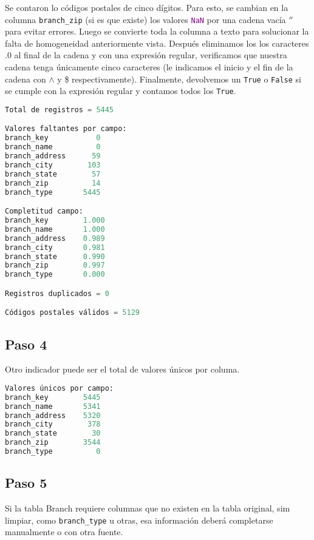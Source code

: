 Se contaron lo códigos postales de cinco dígitos. Para esto, se cambian en 
la columna \texttt{branch\_zip} (si es que existe) los valores 
\textcolor{purple}{\texttt{NaN}} por una cadena vacía $''$ para evitar errores. 
Luego se convierte toda la columna a texto para solucionar la falta de homogeneidad 
anteriormente vista. Después eliminamos los los caracteres $.0$ al final de la cadena 
y con una expresión regular, verificamos que nuestra cadena tenga únicamente cinco 
caracteres (le indicamos el inicio y el fin de la cadena con $\land$ y \$ respectivamente).
Finalmente, devolvemos un \texttt{True} o \texttt{False} si se cumple con la expresión 
regular y contamos todos los \texttt{True}. 

\vspace{0.5 cm}

\begin{lstlisting}[language = Python, caption = {Estadísticas}]
Total de registros = 5445

Valores faltantes por campo:
branch_key           0
branch_name          0
branch_address      59
branch_city        103
branch_state        57
branch_zip          14
branch_type       5445

Completitud campo:
branch_key        1.000
branch_name       1.000
branch_address    0.989
branch_city       0.981
branch_state      0.990
branch_zip        0.997
branch_type       0.000

Registros duplicados = 0

Códigos postales válidos = 5129
\end{lstlisting}

\vspace{2.5 cm}

\subsection*{Paso 4}

Otro indicador puede ser el total de valores únicos por columa.

\vspace{0.5 cm}



\vspace{0.5 cm}

\begin{lstlisting}[language = Python, caption = {Valores únicos por campo.}]
Valores únicos por campo:
branch_key        5445
branch_name       5341
branch_address    5320
branch_city        378
branch_state        30
branch_zip        3544
branch_type          0
\end{lstlisting}

\vspace{0.5 cm}

\subsection*{Paso 5}

Si la tabla Branch requiere columnas que no existen en la tabla original, 
sim limpiar, como \texttt{branch\_type} u otras, esa información deberá 
completarse manualmente o con otra fuente.